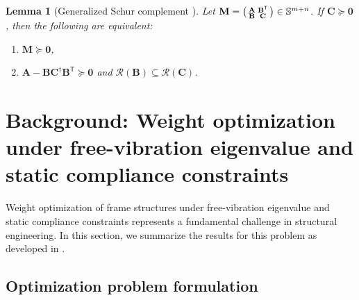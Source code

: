 \documentclass[preprint,3p]{elsarticle}
\newtheorem{lemma}{Lemma}
\newcommand{\T}{^{\mathsf T}}
\newcommand{\range}[1]{\ensuremath{\mathcal{R}\!\left(#1\right)}}
\numberwithin{equation}{section}
\begin{document}
\begin{lemma}[Generalized Schur complement \textup{\citep[Theorem~1.20]{Horn2005}}]\label{lem:gen_schur_complement}
Let $\mathbf{M}=\begin{psmallmatrix}\mathbf{A}&\mathbf{B}\T\\ \mathbf{B}&\mathbf{C}\end{psmallmatrix}\in\mathbb{S}^{m+n}$. If $\mathbf{C}\succeq\mathbf{0}$, then the following are equivalent:
\begin{enumerate}
\item $\mathbf{M}\succeq\mathbf{0}$,
\item $\mathbf{A}-\mathbf{B}\mathbf{C}^\dagger\mathbf{B}\T\succeq\mathbf{0}$ and $\range{\mathbf{B}}\subseteq\range{\mathbf{C}}$.
\end{enumerate}
\end{lemma}

\section{Background: Weight optimization under free-vibration eigenvalue and static compliance constraints}

Weight optimization of frame structures under free-vibration eigenvalue and static compliance constraints represents a fundamental challenge in structural engineering. In this section, we summarize the results for this problem as developed in \citep{Tyburec2024global}.

\subsection{Optimization problem formulation}\label{sec:freevib}
\end{document}
